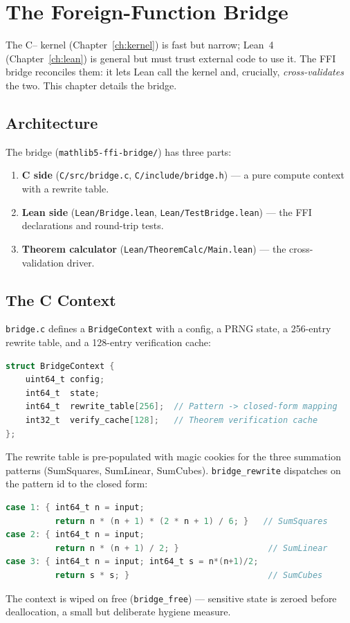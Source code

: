 \chapter{The Foreign-Function Bridge}
\label{ch:ffi}

The C{--} kernel (Chapter~\ref{ch:kernel}) is fast but narrow; Lean~4
(Chapter~\ref{ch:lean}) is general but must trust external code to use it. The
FFI bridge reconciles them: it lets Lean call the kernel and, crucially,
\emph{cross-validates} the two. This chapter details the bridge.

\section{Architecture}
\label{sec:ffi-arch}

The bridge (\texttt{mathlib5-ffi-bridge/}) has three parts:
\begin{enumerate}
  \item \textbf{C side} (\texttt{C/src/bridge.c}, \texttt{C/include/bridge.h})
        --- a pure compute context with a rewrite table.
  \item \textbf{Lean side} (\texttt{Lean/Bridge.lean}, \texttt{Lean/TestBridge.lean})
        --- the FFI declarations and round-trip tests.
  \item \textbf{Theorem calculator} (\texttt{Lean/TheoremCalc/Main.lean})
        --- the cross-validation driver.
\end{enumerate}

\section{The C Context}
\label{sec:ffi-c}

\texttt{bridge.c} defines a \texttt{BridgeContext} with a config, a PRNG
state, a 256-entry rewrite table, and a 128-entry verification cache:
\begin{lstlisting}[language=C,caption={Bridge context (bridge.c).},label=lst:ffi-c]
struct BridgeContext {
    uint64_t config;
    int64_t  state;
    int64_t  rewrite_table[256];  // Pattern -> closed-form mapping
    int32_t  verify_cache[128];   // Theorem verification cache
};
\end{lstlisting}
The rewrite table is pre-populated with magic cookies for the three summation
patterns (SumSquares, SumLinear, SumCubes). \texttt{bridge\_rewrite} dispatches
on the pattern id to the closed form:
\begin{lstlisting}[language=C,caption={Closed-form dispatch (bridge.c).},label=lst:ffi-dispatch]
case 1: { int64_t n = input;
          return n * (n + 1) * (2 * n + 1) / 6; }   // SumSquares
case 2: { int64_t n = input;
          return n * (n + 1) / 2; }                  // SumLinear
case 3: { int64_t n = input; int64_t s = n*(n+1)/2;
          return s * s; }                            // SumCubes
\end{lstlisting}
The context is wiped on free (\texttt{bridge\_free}) --- sensitive state is
zeroed before deallocation, a small but deliberate hygiene measure.


